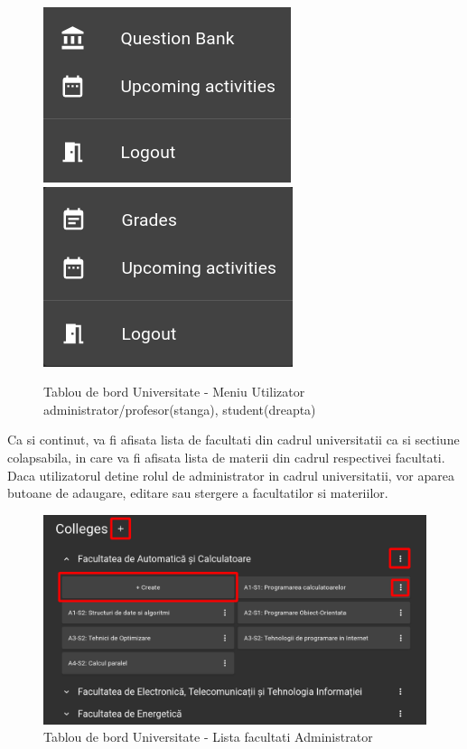 \documentclass[12pt, a4paper, oneside, romanian]{teza-upb}
\begin{document}
\begin{figure}[H]
\centering
\includegraphics*[width=0.4\columnwidth]{tablou-de-bord-universitate-meniu-utilizator-administrator}
\includegraphics*[width=0.4\columnwidth]{tablou-de-bord-universitate-meniu-utilizator-student}
\caption{Tablou de bord Universitate - Meniu Utilizator administrator/profesor(stanga), student(dreapta)}
\label{tablou-de-bord-universitate-meniu-utilizator-administrator}
\end{figure}

Ca si continut, va fi afisata lista de facultati din cadrul universitatii ca si sectiune colapsabila, in care va fi afisata lista de materii din cadrul respectivei facultati. Daca utilizatorul detine rolul de administrator in cadrul universitatii, vor aparea butoane de adaugare, editare sau stergere a facultatilor si materiilor.

\begin{figure}[H]
\centering
\includegraphics*[width=\columnwidth]{tablou-de-bord-universitate-lista-facultati-administrator}
\caption{Tablou de bord Universitate - Lista facultati Administrator}
\label{tablou-de-bord-universitate-lista-facultati-administrator}
\end{figure}
\end{document}
